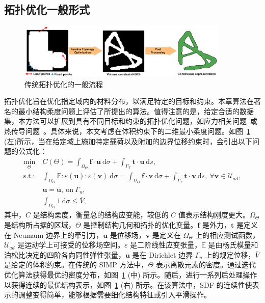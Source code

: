 \subsection{拓扑优化一般形式}
\begin{figure}[b]
    \centering
    \includegraphics[width=0.9\textwidth]{./figures/TONIR/1-TO.png}
    \caption{传统拓扑优化的一般流程}
    \label{fig:TO}
\end{figure}
拓扑优化旨在优化指定域内的材料分布，以满足特定的目标和约束。本章算法在著名的最小结构柔度问题上评估了所提出的算法。值得注意的是，给定合适的数据集，本方法可以扩展到具有不同目标和约束的拓扑优化问题，如应力相关问题~\cite{le2010stress}或热传导问题~\cite{takezawa2014}。具体来说，本文考虑在体积约束下的二维最小柔度问题。如图~\ref{fig:TO} (左)所示，当在给定域上施加特定载荷以及附加的边界位移约束时，会引出以下问题的公式化：
\begin{subequations}\label{eq:opti_problem}
    \begin{align}
        \min_{\Theta}~
         & C(\Theta)=\int_{\Omega_\Theta} \mathbf{f}\cdot\mathbf{u}~\mathrm{d}\sigma+\int_{\Gamma_T} \mathbf{t}\cdot\mathbf{u}~\mathrm{d}s,                              \\
        \text{s.t.:}~
         & \int_{\Omega_\Theta}\mathbb{E}:\varepsilon(\mathbf{u}):\varepsilon(\mathbf{v})~\mathrm{d}\sigma = \int_{\Omega_\Theta}\mathbf{f}\cdot\mathbf{v}~\mathrm{d}\sigma+\int_{\Gamma_T}\mathbf{t}\cdot\mathbf{v}~\mathrm{d}s,~\forall \mathbf{v}\in\mathcal{U}_{ad}, \\
         & \mathbf{u}=\mathbf{\overline{u}},~\text{on}~\Gamma_u,                                                                                                         \\
         & \int_{\Omega_\Theta}1~\mathrm{d}\sigma\leq\overline{V},
    \end{align}
\end{subequations}
其中，$C$ 是结构柔度，衡量总的结构应变能，较低的 $C$ 值表示结构刚度更大。$\Omega_\Theta$ 是结构所占据的区域，$\Theta$ 是控制结构几何和拓扑的优化变量。$\mathbf{f}$ 是外力，$\mathbf{t}$ 是定义在 Neumann 边界上的牵引力，$\mathbf{u}$ 是位移场，$\mathbf{v}$ 是定义在 $\Omega_\Theta$ 上的相应测试函数，$\mathcal{U}_{ad}$ 是运动学上可接受的位移场空间。$\varepsilon$ 是二阶线性应变张量，$\mathbb{E}$ 是由杨氏模量和泊松比决定的四阶各向同性弹性张量，$\overline{\mathbf{u}}$ 是在 Dirichlet 边界 $\Gamma_u$ 上的规定位移，$\overline{V}$ 是给定的体积约束。在传统的 SIMP 方法中，$\Theta$ 表示离散元素的密度。通过迭代优化算法获得最优的密度分布，如图~\ref{fig:TO} (中) 所示。随后，进行一系列后处理操作以获得连续的最优结构表示，如图~\ref{fig:TO} (右) 所示。在该算法中，SDF 的连续性使表示的调整变得简单，能够根据需要细化结构特征或引入平滑操作。


